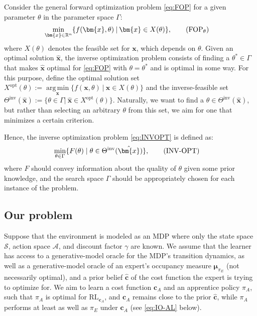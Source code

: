 \documentclass[10pt]{article} %
\def\Ac{\ensuremath{\mathcal{A}}}
\def\vc{{\bm{c}}}
\def\vx{{\bm{x}}}
\def\vmu{{\bm{\mu}}}
\newcommand{\R}{\mathbb{R}}
\newcommand{\St}{\mathcal{S}}
\DeclareMathOperator*{\argmin}{arg\,min}
\begin{document}
Consider the general forward optimization problem \eqref{eq:FOP} for a given parameter $\theta$ in the parameter space $\Gamma$:
\begin{align*}
    \min\limits_{\vx \in \R^n}\{f(&\vx, \theta) \:|\: \vx\in X(\theta)\}, \tag{$\text{FOP}_{\theta}$} \label{eq:FOP}
\end{align*}
where $X(\theta)$ denotes the feasible set for $\vx$, which depends on $\theta$. Given an optimal solution $\hat{\vx}$, the inverse optimization problem consists of finding a $\theta^*\in\Gamma$ that makes $\hat{\vx}$ optimal for \eqref{eq:FOP} with $\theta = \theta^*$ and is optimal in some way. For this purpose, define the optimal solution set  
$X^{\text{opt}}(\theta) := \argmin\limits_{\vx}\{f(\vx,\theta) \: | \: \vx \in X(\theta)\}$
and the inverse-feasible set
$\Theta^{\text{inv}}(\hat{\vx}) := \{\theta \in\Gamma | \: \hat{\vx}\in X^{\text{opt}}(\theta)\}$. Naturally, we want to find a $\theta \in \Theta^{\text{inv}}(\hat{\vx})$, but rather than selecting an arbitrary $\theta$ from this set, we aim for one that minimizes a certain criterion. \par

Hence, the inverse optimization problem \eqref{eq:INVOPT} is defined as:
\begin{align*}
    \min\limits_{\theta \in \Gamma}\{F(\theta) \mid \theta &\in \Theta^{\text{inv}}(\hat{\vx})\}, \tag{\text{INV-OPT}} \label{eq:INVOPT}
\end{align*}
where $F$ should convey information about the quality of $\theta$ given some prior knowledge, and the search space $\Gamma$ should be appropriately chosen for each instance of the problem.

\subsection{Our problem}

Suppose that the environment is modeled as an MDP where only the state space $\St$, action space $\Ac$, and discount factor $\gamma$ are known. We assume that the learner has access to a generative-model oracle for the MDP's transition dynamics, as well as a generative-model oracle of an expert's occupancy measure $\vmu_{\pi_E}$ (not necessarily optimal), and a prior belief $\hat{\vc}$ of the cost function the expert is trying to optimize for. We aim to learn a cost function $\vc_A$ and an apprentice policy $\pi_A$, such that $\pi_A$ is optimal for $\text{RL}_{\vc_A}$, and $\vc_A$ remains close to the prior $\hat{\vc}$, while $\pi_A$ performs at least as well as $\pi_E$ under $\vc_A$ (see \eqref{eq:IO-AL} below). 
\end{document}
